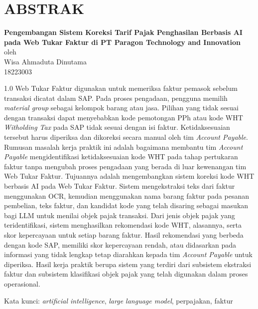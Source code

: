 \chapter*{ABSTRAK}

\begin{center}

    \textbf{Pengembangan Sistem Koreksi Tarif Pajak Penghasilan Berbasis AI pada Web Tukar Faktur di PT Paragon Technology and Innovation} \\
    \vspace{0.4cm}
    oleh \\
    \vspace{0.4cm}
    Wisa Ahmaduta Dinutama\\
    18223003\\
\end{center}


\begin{spacing}{1.0}
Web Tukar Faktur digunakan untuk memeriksa faktur pemasok sebelum transaksi dicatat dalam SAP. Pada proses pengadaan, pengguna memilih \textit{material group} sebagai kelompok barang atau jasa. Pilihan yang tidak sesuai dengan transaksi dapat menyebabkan kode pemotongan PPh atau kode WHT \textit{Witholding Tax} pada SAP tidak sesuai dengan isi faktur. Ketidaksesuaian tersebut harus diperiksa dan dikoreksi secara manual oleh tim \label{abbr:AP}\textit{Account Payable}. Rumusan masalah kerja praktik ini adalah bagaimana membantu tim \textit{Account Payable} mengidentifikasi ketidaksesuaian kode WHT pada tahap pertukaran faktur tanpa mengubah proses pengadaan yang berada di luar kewenangan tim Web Tukar Faktur. Tujuannya adalah mengembangkan sistem koreksi kode WHT berbasis \label{abbr:AI}AI pada Web Tukar Faktur. Sistem mengekstraksi teks dari faktur menggunakan OCR, kemudian menggunakan nama barang faktur pada pesanan pembelian, teks faktur, dan kandidat kode yang telah disaring sebagai masukan bagi LLM untuk menilai objek pajak transaksi. Dari jenis objek pajak yang teridentifikasi, sistem menghasilkan rekomendasi kode WHT, alasannya, serta skor kepercayaan untuk setiap barang faktur. Hasil rekomendasi yang berbeda dengan kode SAP, memiliki skor kepercayaan rendah, atau didasarkan pada informasi yang tidak lengkap tetap diarahkan kepada tim \textit{Account Payable} untuk diperiksa. Hasil kerja praktik berupa sistem yang terdiri dari subsistem ekstraksi faktur dan subsistem klasifikasi objek pajak yang telah digunakan dalam proses operasional.

Kata kunci: \textit{artificial intelligence}, \textit{large language model}, perpajakan, faktur

\end{spacing}

